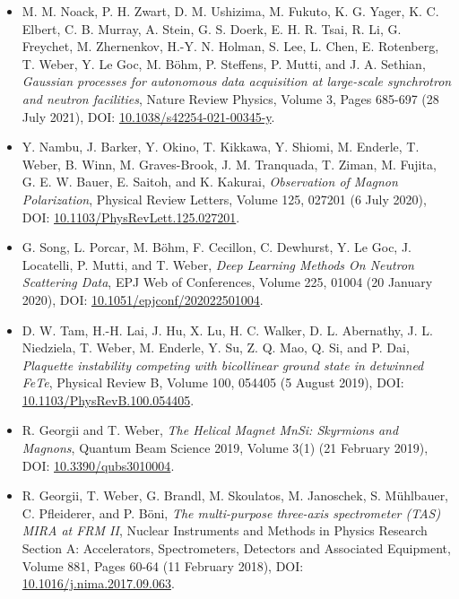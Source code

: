 \begin{itemize}
	\item M. M. Noack, P. H. Zwart, D. M. Ushizima, M. Fukuto, K. G. Yager, K. C. Elbert, 
		C. B. Murray, A. Stein, G. S. Doerk, E. H. R. Tsai, R. Li, G. Freychet, 
		M. Zhernenkov, H.-Y. N. Holman, S. Lee, L. Chen, E. Rotenberg, T. Weber, 
		Y. Le Goc, M. B\"ohm, P. Steffens, P. Mutti, and J. A. Sethian, 
	\textit{Gaussian processes for autonomous data acquisition at large-scale synchrotron and neutron facilities},
	Nature Review Physics, Volume 3, Pages 685-697 (28 July 2021),
	DOI: \href{https://doi.org/10.1038/s42254-021-00345-y}{10.1038/s42254-021-00345-y}.

	\item Y. Nambu, J. Barker, Y. Okino, T. Kikkawa, Y. Shiomi, M. Enderle, T. Weber, B. Winn, M. Graves-Brook, J. M. Tranquada, T. Ziman, M. Fujita, G. E. W. Bauer, E. Saitoh, and K. Kakurai, 
	\textit{Observation of Magnon Polarization},
	Physical Review Letters, Volume 125, 027201 (6 July 2020),
	DOI: \href{https://doi.org/10.1103/PhysRevLett.125.027201}{10.1103/PhysRevLett.125.027201}.

	\item G. Song, L. Porcar, M. B\"ohm, F. Cecillon, C. Dewhurst, Y. Le Goc, J. Locatelli, P. Mutti, and T. Weber, 
	\textit{Deep Learning Methods On Neutron Scattering Data},
	EPJ Web of Conferences, Volume 225, 01004 (20 January 2020),
	DOI: \href{https://doi.org/10.1051/epjconf/202022501004}{10.1051/epjconf/202022501004}.

	\item D. W. Tam, H.-H. Lai, J. Hu, X. Lu, H. C. Walker, D. L. Abernathy, J. L. Niedziela, T. Weber, M. Enderle, Y. Su, Z. Q. Mao, Q. Si, and P. Dai,
	\textit{Plaquette instability competing with bicollinear ground state in detwinned FeTe},
	Physical Review B, Volume 100, 054405 (5 August 2019),
	DOI: \href{https://doi.org/10.1103/PhysRevB.100.054405}{10.1103/PhysRevB.100.054405}.
	
	\item R. Georgii and T. Weber,
	\textit{The Helical Magnet MnSi: Skyrmions and Magnons},
	Quantum Beam Science 2019, Volume 3(1) (21 February 2019),
	DOI: \href{https://doi.org/10.3390/qubs3010004}{10.3390/qubs3010004}.
	
	\item R. Georgii, T. Weber, G. Brandl, M. Skoulatos, M. Janoschek, S. Mühlbauer, C. Pfleiderer, and P. B\"oni,
	\textit{The multi-purpose three-axis spectrometer (TAS) MIRA at FRM II},
	Nuclear Instruments and Methods in Physics Research Section A: Accelerators, Spectrometers, Detectors and Associated Equipment, Volume 881, Pages 60-64 (11 February 2018),
	DOI: \href{https://doi.org/10.1016/j.nima.2017.09.063}{10.1016/j.nima.2017.09.063}.
\end{itemize}
